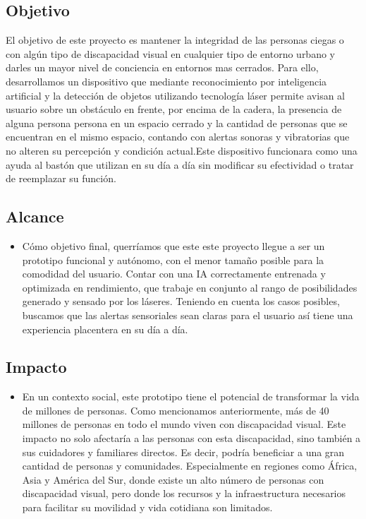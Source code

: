 \documentclass[12pt,a4paper]{article}
\begin{document}
\subsection{Objetivo}
El objetivo de este proyecto es mantener la integridad de las personas ciegas o con algún tipo de discapacidad visual en cualquier tipo de entorno urbano y darles un mayor nivel de conciencia en entornos mas cerrados. Para ello, desarrollamos un dispositivo que mediante reconocimiento por inteligencia artificial y la detección de objetos utilizando tecnología láser permite avisan al usuario sobre un obstáculo en frente, por encima de la cadera, la presencia de alguna persona persona en un espacio cerrado y la cantidad de personas que se encuentran en el mismo espacio, contando con alertas sonoras y vibratorias que no alteren su percepción y condición actual.Este dispositivo funcionara como una ayuda al bastón que utilizan en su día a día sin modificar su efectividad o tratar de reemplazar su función.

\subsection{Alcance}
\begin{itemize}

\item Cómo objetivo final, querríamos que este este proyecto llegue a ser un prototipo funcional y autónomo, con el menor tamaño posible para la comodidad del usuario. Contar con una IA correctamente entrenada y optimizada en rendimiento, que trabaje en conjunto al rango de posibilidades generado y sensado por los láseres. Teniendo en cuenta los casos posibles, buscamos que las alertas sensoriales sean claras para el usuario así tiene una experiencia placentera en su día a día.
\end{itemize}

\subsection{Impacto}
 \begin{itemize}
 
\item En un contexto social, este prototipo tiene el potencial de transformar la vida de millones de personas. Como mencionamos anteriormente, más de 40 millones de personas en todo el mundo viven con discapacidad visual. Este impacto no solo afectaría a las personas con esta discapacidad, sino también a sus cuidadores y familiares directos. Es decir, podría beneficiar a una gran cantidad de personas y comunidades. Especialmente en regiones como África, Asia y América del Sur, donde existe un alto número de personas con discapacidad visual, pero donde los recursos y la infraestructura necesarios para facilitar su movilidad y vida cotidiana son limitados.

     
 \end{itemize}
\end{document}
